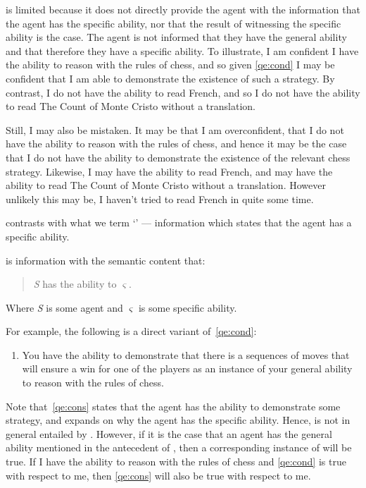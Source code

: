 \begin{note}
  \gsi{} is limited because it does not directly provide the agent with the information that the agent has the specific ability, nor that the result of witnessing the specific ability is the case.
  The agent is not informed that they have the general ability and that therefore they have a specific ability.
  To illustrate, I am confident I have the ability to reason with the rules of chess, and so given \ref{qe:cond} I may be confident that I am able to demonstrate the existence of such a strategy.
  By contrast, I do not have the ability to read French, and so I do not have the ability to read The Count of Monte Cristo without a translation.

  Still, I may also be mistaken.
  It may be that I am overconfident, that I do not have the ability to reason with the rules of chess, and hence it may be the case that I do not have the ability to demonstrate the existence of the relevant chess strategy.
  Likewise, I may have the ability to read French, and may have the ability to read The Count of Monte Cristo without a translation.
  However unlikely this may be, I haven't tried to read French in quite some time.
\end{note}

\begin{note}
  \Gsi{} contrasts with what we term `\dsi{-}' --- information which states that the agent has a specific ability.
  \begin{definition}[\dsi{}]
    \Dsi{-} is information with the semantic content that:
    \begin{quote}
      \emph{S} has the ability to \(\varsigma\).
    \end{quote}
    Where \emph{S} is some agent and \(\varsigma\) is some specific ability.
  \end{definition}
  For example, the following is a direct variant of~\ref{qe:cond}:

  \begin{enumerate}[label=(\dsi{}\arabic*), ref=(\dsi{}\arabic*), series=dsi_count]
  \item\label{qe:cons} You have the ability to demonstrate that there is a sequences of moves that will ensure a win for one of the players as an instance of your general ability to reason with the rules of chess.
  \end{enumerate}

  Note that~\ref{qe:cons} states that the agent has the ability to demonstrate some strategy, and expands on why the agent has the specific ability.
  Hence, \dsi{} is not in general entailed by \gsi{}.
  However, if it is the case that an agent has the general ability mentioned in the antecedent of \gsi{}, then a corresponding instance of \dsi{} will be true.
  If I have the ability to reason with the rules of chess and \ref{qe:cond} is true with respect to me, then \ref{qe:cons} will also be true with respect to me.
\end{note}

